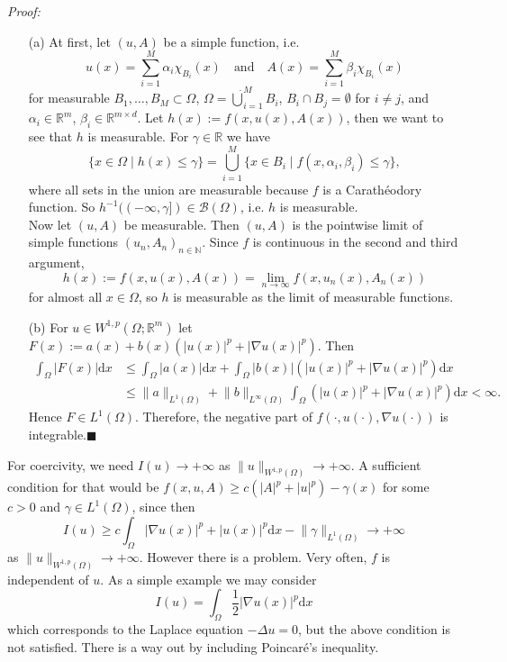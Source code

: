 \textit{Proof:}
\begin{itemize}
	\item[(a)] At first, let $(u,A)$ be a simple function, i.e.
	\[u(x)=\sum_{i=1}^M{\alpha_i\chi_{B_i}(x)}\quad\text{and}\quad A(x)=\sum_{i=1}^M{\beta_i\chi_{B_i}(x)}\]
	for measurable $B_1,\dotsc,B_M\subset\Omega$, $\Omega=\dot\bigcup_{i=1}^M{B_i}$, $B_i\cap B_j=\emptyset$ for $i\ne j$, and $\alpha_i\in\mathbb{R}^m$, $\beta_i\in\mathbb{R}^{m\times d}$. Let $h(x):=f(x,u(x),A(x))$, then we want to see that $h$ is measurable. For $\gamma\in\mathbb{R}$ we have
	\[\{x\in\Omega\mid h(x)\leq\gamma\}=\bigcup_{i=1}^M{\{x\in B_i\mid f(x,\alpha_i,\beta_i)\leq\gamma\}},\]
	where all sets in the union are measurable because $f$ is a Carath\'eodory function. So $h^{-1}((-\infty,\gamma])\in\mathcal{B}(\Omega)$, i.e. $h$ is measurable.\\

	Now let $(u,A)$ be measurable. Then $(u,A)$ is the pointwise limit of simple functions $(u_n,A_n)_{n\in\mathbb{N}}$. Since $f$ is continuous in the second and third argument,
	\[h(x):=f(x,u(x),A(x))=\lim_{n\to\infty}{f(x,u_n(x),A_n(x))}\]
	for almost all $x\in\Omega$, so $h$ is measurable as the limit of measurable functions.
	\item[(b)] For $u\in W^{1,p}(\Omega;\mathbb{R}^m)$ let $F(x):=a(x)+b(x)(\lvert u(x)\rvert^p+\lvert\nabla u(x)\rvert^p)$. Then
	\begin{align*}
		\int_\Omega{\lvert F(x)\rvert\mathrm{d}x}&\leq\int_\Omega{\lvert a(x)\rvert\mathrm{d}x}+\int_\Omega{\lvert b(x)\rvert(\lvert u(x)\rvert^p+\lvert\nabla u(x)\rvert^p)\mathrm{d}x}\\
		&\leq\lVert a\rVert_{L^1(\Omega)}+\lVert b\rVert_{L^\infty(\Omega)}\int_\Omega{(\lvert u(x)\rvert^p+\lvert\nabla u(x)\rvert^p)\mathrm{d}x}<\infty.
	\end{align*}
	Hence $F\in L^1(\Omega)$. Therefore, the negative part of $f(\cdot,u(\cdot),\nabla u(\cdot))$ is integrable.\hfill$\blacksquare$\\[11pt]
\end{itemize}

For coercivity, we need $I(u)\to+\infty$ as $\lVert u\rVert_{W^{1,p}(\Omega)}\to+\infty$. A sufficient condition for that would be $f(x,u,A)\geq c(\lvert A\rvert^p+\lvert u\rvert^p)-\gamma(x)$ for some $c>0$ and $\gamma\in L^1(\Omega)$, since then
\[I(u)\geq c\int_\Omega{\lvert\nabla u(x)\rvert^p+\lvert u(x)\rvert^p\mathrm{d}x}-\lVert\gamma\rVert_{L^1(\Omega)}\to+\infty\]
as $\lVert u\rVert_{W^{1,p}(\Omega)}\to+\infty$. However there is a problem. Very often, $f$ is independent of $u$. As a simple example we may consider
\[I(u)=\int_\Omega{\frac{1}{2}\lvert\nabla u(x)\rvert^p\mathrm{d}x}\]
which corresponds to the Laplace equation $-\Delta u=0$, but the above condition is not satisfied. There is a way out by including Poincar\'e's inequality.\\[11pt]

